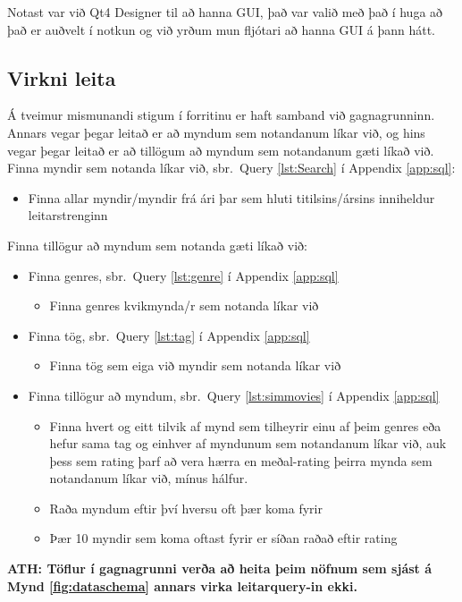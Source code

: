\documentclass[12pt, git, draft]{rureport}
\begin{document}
Notast var við Qt4 Designer \cite{qt4} til að hanna GUI, það var valið með það í huga að það er auðvelt í notkun og við yrðum mun fljótari að hanna GUI á þann hátt.

\subsection{Virkni leita}
Á tveimur mismunandi stigum í forritinu er haft samband við gagnagrunninn. Annars vegar þegar leitað er að myndum sem notandanum líkar við, og hins vegar þegar leitað er að tillögum að myndum sem notandanum gæti líkað við.
\\
Finna myndir sem notanda líkar við, sbr.~Query \ref{lst:Search} í Appendix \ref{app:sql}:
\begin{itemize}
	\item Finna allar myndir/myndir frá ári þar sem hluti titilsins/ársins inniheldur leitarstrenginn
\end{itemize}
Finna tillögur að myndum sem notanda gæti líkað við:
\begin{itemize}
	\item Finna genres, sbr.~Query \ref{lst:genre} í Appendix \ref{app:sql}
	\begin{itemize}
		\item Finna genres kvikmynda/r sem notanda líkar við
	\end{itemize}
	\item Finna tög, sbr.~Query \ref{lst:tag} í Appendix \ref{app:sql}
	\begin{itemize}
		\item Finna tög sem eiga við myndir sem notanda líkar við
	\end{itemize}
	\item Finna tillögur að myndum, sbr.~Query \ref{lst:simmovies} í Appendix \ref{app:sql}
	\begin{itemize}
		\item Finna hvert og eitt tilvik af mynd sem tilheyrir einu af þeim genres eða hefur sama tag og einhver af myndunum sem notandanum líkar við, auk þess sem rating þarf að vera hærra en meðal-rating þeirra mynda sem notandanum líkar við, mínus hálfur.
		\item Raða myndum eftir því hversu oft þær koma fyrir
		\item Þær 10 myndir sem koma oftast fyrir er síðan raðað eftir rating
	\end{itemize}
\end{itemize}
\textbf{ATH: Töflur í gagnagrunni verða að heita þeim nöfnum sem sjást á Mynd \ref{fig:dataschema} annars virka leitarquery-in ekki.}
\end{document}

